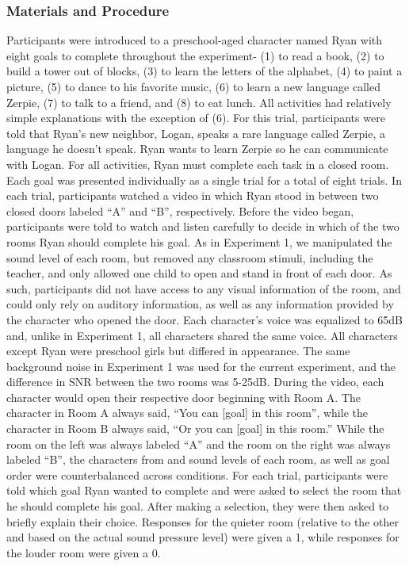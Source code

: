 \documentclass[10pt, letterpaper]{article}
\begin{document}
\hypertarget{materials-and-procedure-2}{%
\subsubsection{Materials and
Procedure}\label{materials-and-procedure-2}}

Participants were introduced to a preschool-aged character named Ryan
with eight goals to complete throughout the experiment- (1) to read a
book, (2) to build a tower out of blocks, (3) to learn the letters of
the alphabet, (4) to paint a picture, (5) to dance to his favorite
music, (6) to learn a new language called Zerpie, (7) to talk to a
friend, and (8) to eat lunch. All activities had relatively simple
explanations with the exception of (6). For this trial, participants
were told that Ryan's new neighbor, Logan, speaks a rare language called
Zerpie, a language he doesn't speak. Ryan wants to learn Zerpie so he
can communicate with Logan. For all activities, Ryan must complete each
task in a closed room. Each goal was presented individually as a single
trial for a total of eight trials. In each trial, participants watched a
video in which Ryan stood in between two closed doors labeled ``A'' and
``B'', respectively. Before the video began, participants were told to
watch and listen carefully to decide in which of the two rooms Ryan
should complete his goal. As in Experiment 1, we manipulated the sound
level of each room, but removed any classroom stimuli, including the
teacher, and only allowed one child to open and stand in front of each
door. As such, participants did not have access to any visual
information of the room, and could only rely on auditory information, as
well as any information provided by the character who opened the door.
Each character's voice was equalized to 65dB and, unlike in Experiment
1, all characters shared the same voice. All characters except Ryan were
preschool girls but differed in appearance. The same background noise in
Experiment 1 was used for the current experiment, and the difference in
SNR between the two rooms was 5-25dB. During the video, each character
would open their respective door beginning with Room A. The character in
Room A always said, ``You can {[}goal{]} in this room'', while the
character in Room B always said, ``Or you can {[}goal{]} in this room.''
While the room on the left was always labeled ``A'' and the room on the
right was always labeled ``B'', the characters from and sound levels of
each room, as well as goal order were counterbalanced across conditions.
For each trial, participants were told which goal Ryan wanted to
complete and were asked to select the room that he should complete his
goal. After making a selection, they were then asked to briefly explain
their choice. Responses for the quieter room (relative to the other and
based on the actual sound pressure level) were given a 1, while
responses for the louder room were given a 0.
\end{document}
